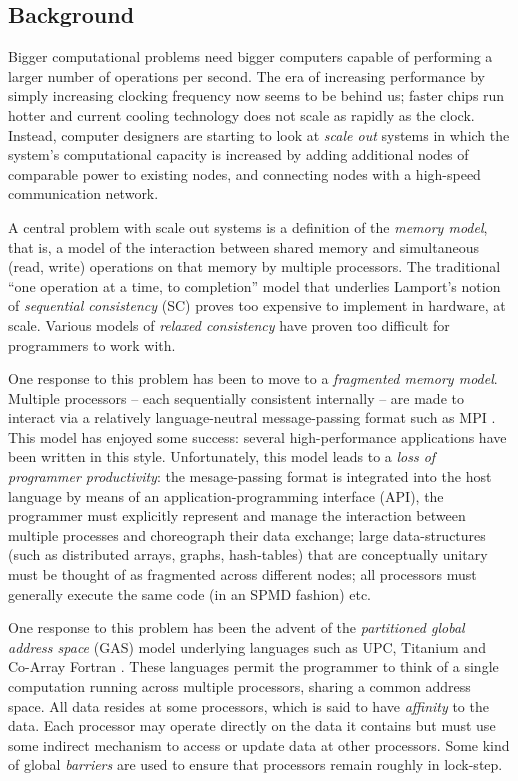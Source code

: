 \subsection*{Background}
Bigger computational problems need bigger computers capable of
performing a larger number of operations per second. The era of
increasing performance by simply increasing clocking frequency now
seems to be behind us; faster chips run hotter and current cooling
technology does not scale as rapidly as the clock. Instead, computer
designers are starting to look at {\em scale out} systems in which the
system's computational capacity is increased by adding additional
nodes of comparable power to existing nodes, and connecting nodes with
a high-speed communication network.

A central problem with scale out systems is a definition of the {\em
memory model}, that is, a model of the interaction between shared
memory and  simultaneous (read, write) operations on that
memory by multiple processors. The traditional ``one operation at a
time, to completion'' model that underlies Lamport's notion of {\em
sequential consistency} (SC) proves too expensive to implement in
hardware, at scale. Various models of {\em relaxed consistency} have
proven too difficult for programmers to work with.  

One response to this problem has been to move to a {\em fragmented
memory model}. Multiple processors -- each sequentially consistent
internally -- are made to interact via a relatively language-neutral
message-passing format such as MPI \cite{mpi}. This model has enjoyed
some success: several high-performance applications have been written
in this style. Unfortunately, this model leads to a {\em loss of
programmer productivity}: the mesage-passing format is integrated into
the host language by means of an application-programming interface
(API), the programmer must explicitly represent and manage the
interaction between multiple processes and choreograph their data
exchange; large data-structures (such as distributed arrays, graphs,
hash-tables) that are conceptually unitary must be thought of as
fragmented across different nodes; all processors must generally
execute the same code (in an SPMD fashion) etc.

One response to this problem has been the advent of the {\em
partitioned global address space} (GAS) model underlying languages
such as UPC, Titanium and Co-Array Fortran \cite{pgas,titanium}. These
languages permit the programmer to think of a single computation
running across multiple processors, sharing a common address
space. All data resides at some processors, which is said to have {\em
affinity} to the data.  Each processor may operate directly on the
data it contains but must use some indirect mechanism to access or
update data at other processors. Some kind of global {\em barriers}
are used to ensure that processors remain roughly in lock-step.

